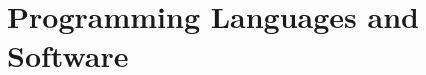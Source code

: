 \section{Programming Languages and Software}\label{sec:programming_languages_and_software}
\vspace{7.5cm}



\vspace{-1.5mm}
\newpage
